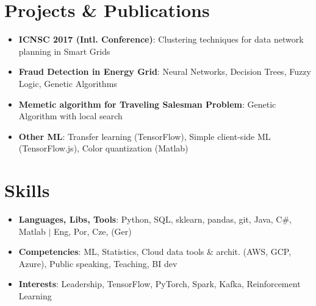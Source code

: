 \documentclass[a4paper,11pt]{article}
\newcommand{\myHrefIcn}[2]{#2 \href{#1}{\scriptsize{\faExternalLink{}}}}
\newcommand{\resumeItem}[2]{
  \item\small{
    \textbf{#1}{: #2 \vspace{-2pt}}
  }
}
\newcommand{\resumeSubItem}[2]{\resumeItem{#1}{#2}\vspace{-4pt}}
\newcommand{\resumeSubHeadingListStart}{\begin{itemize}[leftmargin=*]}
\newcommand{\resumeSubHeadingListEnd}{\end{itemize}}
\newcommand{\csharp}{C\#}
\begin{document}
\section{Projects \& Publications}
  \resumeSubHeadingListStart
    \resumeSubItem{%
        \textbf{%
            \myHrefIcn{http://icnsc2017.dimes.unical.it/}{ICNSC 2017} (Intl. Conference)}}
        {\myHrefIcn{https://ieeexplore.ieee.org/document/8000059/}{Clustering techniques for data network planning in Smart Grids}}
    \resumeSubItem{Fraud Detection in Energy Grid}%
        {Neural Networks, Decision Trees, Fuzzy Logic, Genetic Algorithms}
    \resumeSubItem{Memetic algorithm for Traveling Salesman Problem}{Genetic Algorithm with local search}
    \resumeSubItem{Other ML}
        {Transfer learning (TensorFlow), Simple client-side ML (TensorFlow.js), Color quantization (Matlab)}
  \resumeSubHeadingListEnd

\section{Skills}
  \resumeSubHeadingListStart
    \resumeSubItem{Languages, Libs, Tools}{Python, SQL, sklearn, pandas, git, Java, \csharp, Matlab $\vert$ Eng, Por, Cze, (Ger)}
    \resumeSubItem{Competencies}{ML, Statistics, Cloud data tools \& archit. (AWS, GCP, Azure), Public speaking, Teaching, BI dev}%
    \resumeSubItem{Interests}{Leadership, TensorFlow, PyTorch, Spark, Kafka, Reinforcement Learning}
    
  \resumeSubHeadingListEnd

\end{document}

